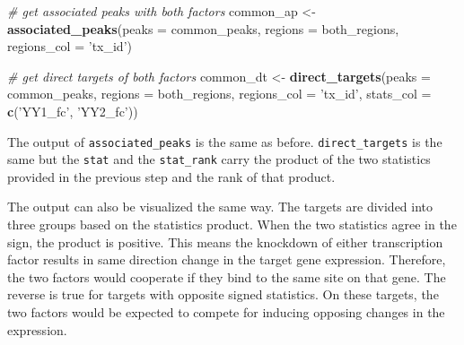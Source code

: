 \documentclass[9pt,a4paper,]{extarticle}
\newenvironment{Shaded}{\begin{snugshade}}{\end{snugshade}}
\newcommand{\CommentTok}[1]{\textcolor[rgb]{0.56,0.35,0.01}{\textit{#1}}}
\newcommand{\DataTypeTok}[1]{\textcolor[rgb]{0.13,0.29,0.53}{#1}}
\newcommand{\KeywordTok}[1]{\textcolor[rgb]{0.13,0.29,0.53}{\textbf{#1}}}
\newcommand{\NormalTok}[1]{#1}
\newcommand{\StringTok}[1]{\textcolor[rgb]{0.31,0.60,0.02}{#1}}
\begin{document}
\begin{Shaded}
\begin{Highlighting}[]
\CommentTok{# get associated peaks with both factors}
\NormalTok{common_ap <-}\StringTok{ }\KeywordTok{associated_peaks}\NormalTok{(}\DataTypeTok{peaks =}\NormalTok{ common_peaks,}
                              \DataTypeTok{regions =}\NormalTok{ both_regions,}
                              \DataTypeTok{regions_col =} \StringTok{'tx_id'}\NormalTok{)}

\CommentTok{# get direct targets of both factors}
\NormalTok{common_dt <-}\StringTok{ }\KeywordTok{direct_targets}\NormalTok{(}\DataTypeTok{peaks =}\NormalTok{ common_peaks,}
                            \DataTypeTok{regions =}\NormalTok{ both_regions,}
                            \DataTypeTok{regions_col =} \StringTok{'tx_id'}\NormalTok{,}
                            \DataTypeTok{stats_col =} \KeywordTok{c}\NormalTok{(}\StringTok{'YY1_fc'}\NormalTok{, }\StringTok{'YY2_fc'}\NormalTok{))}
\end{Highlighting}
\end{Shaded}

The output of \texttt{associated\_peaks} is the same as before. \texttt{direct\_targets} is the same but the \texttt{stat} and the \texttt{stat\_rank} carry the product of the two statistics provided in the previous step and the rank of that product.

The output can also be visualized the same way. The targets are divided into three groups based on the statistics product. When the two statistics agree in the sign, the product is positive. This means the knockdown of either transcription factor results in same direction change in the target gene expression. Therefore, the two factors would cooperate if they bind to the same site on that gene. The reverse is true for targets with opposite signed statistics. On these targets, the two factors would be expected to compete for inducing opposing changes in the expression.
\end{document}
